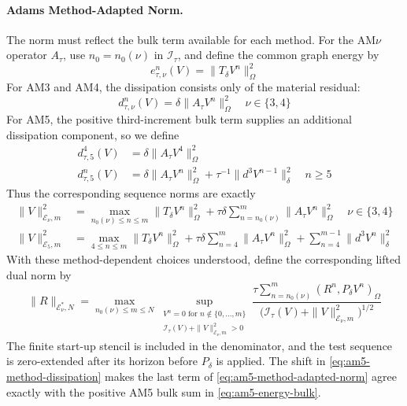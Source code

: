 \documentclass[11pt]{article}
\begin{document}
\paragraph{Adams Method-Adapted Norm.}
The norm must reflect the bulk term available for each method. For the
AM\(\nu\) operator \(A_{\tau}\), use \(n_0=n_0(\nu)\) in
\(\mathcal I_{\tau}\), and define the common graph energy by
\begin{equation}
e_{\tau,\nu}^n(V)=\|T_{\delta}V^n\|_{\Omega}^2 \label{eq:adams-method-energy}
\end{equation}
For AM3 and AM4, the dissipation consists only of the material residual:
\begin{equation}
d_{\tau,\nu}^n(V)=\delta\|A_{\tau}V^n\|_{\Omega}^2
\quad \nu\in\{3,4\} \label{eq:am34-method-dissipation}
\end{equation}
For AM5, the positive third-increment bulk term supplies an additional
dissipation component, so we define
\begin{align}
d_{\tau,5}^4(V)&=\delta\|A_{\tau}V^4\|_{\Omega}^2 \label{eq:am5-initial-dissipation}\\
d_{\tau,5}^n(V)&=\delta\|A_{\tau}V^n\|_{\Omega}^2
+\tau^{-1}\|d^3V^{n-1}\|_{\delta}^2
\quad n\ge5 \label{eq:am5-method-dissipation}
\end{align}
Thus the corresponding sequence norms are exactly
\begin{align}
\|V\|_{\mathcal E_\nu,m}^2
&=\max_{n_0(\nu)\le n\le m}\|T_{\delta}V^n\|_{\Omega}^2
+\tau\delta\sum_{n=n_0(\nu)}^m\|A_{\tau}V^n\|_{\Omega}^2
\quad \nu\in\{3,4\} \label{eq:am34-method-adapted-norm}\\
\|V\|_{\mathcal E_5,m}^2
&=\max_{4\le n\le m}\|T_{\delta}V^n\|_{\Omega}^2
+\tau\delta\sum_{n=4}^m\|A_{\tau}V^n\|_{\Omega}^2
+\sum_{n=4}^{m-1}\|d^3V^n\|_{\delta}^2 \label{eq:am5-method-adapted-norm}
\end{align}
With these method-dependent choices understood, define the corresponding
lifted dual norm by
\begin{equation}
\|R\|_{\mathcal E_\nu^*,N}
=\max_{n_0(\nu)\le m\le N}
\sup_{\substack{V^n=0\text{ for }n\notin\{0,\ldots,m\}\\
\mathcal I_{\tau}(V)+\|V\|_{\mathcal E_\nu,m}^2>0}}
\frac{\tau\sum_{n=n_0(\nu)}^m(R^n,P_{\delta}V^n)_{\Omega}}
{\bigl(\mathcal I_{\tau}(V)+\|V\|_{\mathcal E_\nu,m}^2\bigr)^{1/2}}
\label{eq:adams-lifted-dual-norm}
\end{equation}
The finite start-up stencil is included in the denominator, and the test
sequence is zero-extended after its horizon before \(P_{\delta}\) is
applied. The shift in \eqref{eq:am5-method-dissipation} makes the last term of
\eqref{eq:am5-method-adapted-norm} agree exactly with the positive AM5 bulk
sum in \eqref{eq:am5-energy-bulk}.
\end{document}
